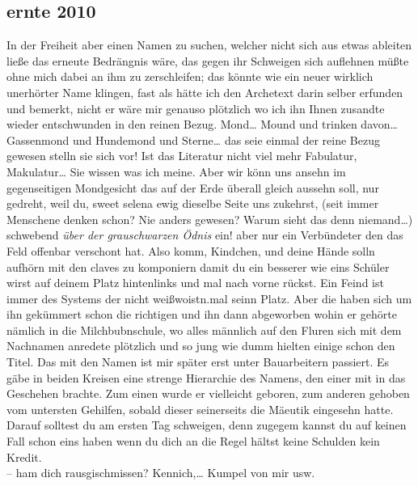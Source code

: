 \documentclass[
]{article}
\author{}
\date{\vspace{-2.5em}}
\begin{document}
\subsection{ernte 2010}\label{ernte-2010}

In der Freiheit aber einen Namen zu suchen, welcher nicht sich aus etwas
ableiten ließe das erneute Bedrängnis wäre, das gegen ihr Schweigen sich
auflehnen müßte ohne mich dabei an ihm zu zerschleifen; das könnte wie
ein neuer wirklich unerhörter Name klingen, fast als hätte ich den
Archetext darin selber erfunden und bemerkt, nicht er wäre mir genauso
plötzlich wo ich ihn Ihnen zusandte wieder entschwunden in den reinen
Bezug. Mond\ldots{} Mound und trinken davon\ldots{} Gassenmond und
Hundemond und Sterne\ldots{} das seie einmal der reine Bezug gewesen
stelln sie sich vor! Ist das Literatur nicht viel mehr Fabulatur,
Makulatur\ldots{} Sie wissen was ich meine. Aber wir könn uns ansehn im
gegenseitigen Mondgesicht das auf der Erde überall gleich aussehn soll,
nur gedreht, weil du, sweet selena ewig dieselbe Seite uns zukehrst,
(seit immer Menschene denken schon? Nie anders gewesen? Warum sieht das
denn niemand\ldots) schwebend \emph{über der grauschwarzen Ödnis} ein!
aber nur ein Verbündeter den das Feld offenbar verschont hat. Also komm,
Kindchen, und deine Hände solln aufhörn mit den claves zu komponiern
damit du ein besserer wie eins Schüler wirst auf deinem Platz
hintenlinks und mal nach vorne rückst. Ein Feind ist immer des Systems
der nicht weißwoistn.mal seinn Platz. Aber die haben sich um ihn
gekümmert schon die richtigen und ihn dann abgeworben wohin er gehörte
nämlich in die Milchbubnschule, wo alles männlich auf den Fluren sich
mit dem Nachnamen anredete plötzlich und so jung wie dumm hielten einige
schon den Titel. Das mit den Namen ist mir später erst unter
Bauarbeitern passiert. Es gäbe in beiden Kreisen eine strenge Hierarchie
des Namens, den einer mit in das Geschehen brachte. Zum einen wurde er
vielleicht geboren, zum anderen gehoben vom untersten Gehilfen, sobald
dieser seinerseits die Mäeutik eingesehn hatte.\\
Darauf solltest du am ersten Tag schweigen, denn zugegem kannst du auf
keinen Fall schon eins haben wenn du dich an die Regel hältst keine
Schulden kein Kredit.\\
-- ham dich rausgischmissen? Kennich,\ldots{} Kumpel von mir usw.
\end{document}
